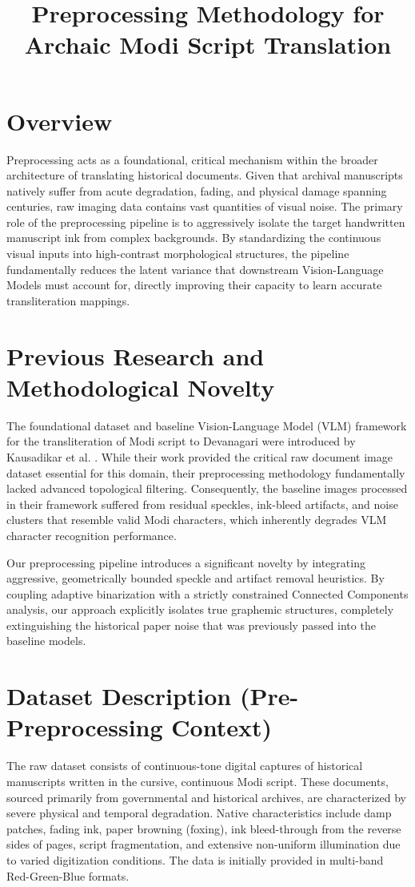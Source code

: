 \documentclass[journal, onecolumn]{IEEEtran}
\begin{document}
\title{Preprocessing Methodology for Archaic Modi Script Translation}
\author{}
\maketitle

\section{Overview}
Preprocessing acts as a foundational, critical mechanism within the broader architecture of translating historical documents. Given that archival manuscripts natively suffer from acute degradation, fading, and physical damage spanning centuries, raw imaging data contains vast quantities of visual noise. The primary role of the preprocessing pipeline is to aggressively isolate the target handwritten manuscript ink from complex backgrounds. By standardizing the continuous visual inputs into high-contrast morphological structures, the pipeline fundamentally reduces the latent variance that downstream Vision-Language Models must account for, directly improving their capacity to learn accurate transliteration mappings.

\section{Previous Research and Methodological Novelty}
The foundational dataset and baseline Vision-Language Model (VLM) framework for the transliteration of Modi script to Devanagari were introduced by Kausadikar et al. \cite{kausadikar2026}. While their work provided the critical raw document image dataset essential for this domain, their preprocessing methodology fundamentally lacked advanced topological filtering. Consequently, the baseline images processed in their framework suffered from residual speckles, ink-bleed artifacts, and noise clusters that resemble valid Modi characters, which inherently degrades VLM character recognition performance. 

Our preprocessing pipeline introduces a significant novelty by integrating aggressive, geometrically bounded speckle and artifact removal heuristics. By coupling adaptive binarization with a strictly constrained Connected Components analysis, our approach explicitly isolates true graphemic structures, completely extinguishing the historical paper noise that was previously passed into the baseline models.

\section{Dataset Description (Pre-Preprocessing Context)}
The raw dataset consists of continuous-tone digital captures of historical manuscripts written in the cursive, continuous Modi script. These documents, sourced primarily from governmental and historical archives, are characterized by severe physical and temporal degradation. Native characteristics include damp patches, fading ink, paper browning (foxing), ink bleed-through from the reverse sides of pages, script fragmentation, and extensive non-uniform illumination due to varied digitization conditions. The data is initially provided in multi-band Red-Green-Blue formats.
\end{document}
